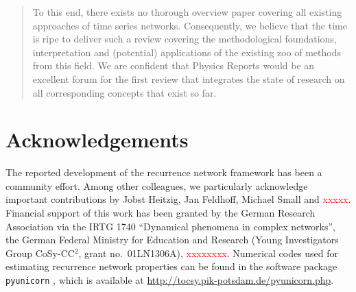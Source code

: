 \documentclass[3p,sort&compress]{elsarticle}
\begin{document}
\begin{frontmatter}
\begin{abstract}
To this end, there exists no thorough overview paper covering all existing
approaches of time series networks. Consequently, we believe that the time is
ripe to deliver such a review covering the methodological foundations,
interpretation and (potential) applications of the existing zoo of methods from
this field. We are confident that Physics Reports would be an excellent forum
for the first review that integrates the state of research on all corresponding
concepts that exist so far.
\end{abstract}

\begin{keyword}
\end{keyword}

\end{frontmatter}
\tableofcontents


























\section*{Acknowledgements}

The reported development of the recurrence network framework has been a community effort. Among other colleagues, we particularly acknowledge important contributions by Jobst Heitzig, Jan Feldhoff, Michael Small and \textcolor{red}{xxxxx}. Financial support of this work has been granted by the German Research Association via the IRTG 1740 ``Dynamical phenomena in complex networks'', the German Federal Ministry for Education and Research (Young Investigators Group CoSy-CC$^2$, grant no.~01LN1306A), \textcolor{red}{xxxxxxxx}. Numerical codes used for estimating recurrence network properties can be found in the software package \texttt{pyunicorn} \cite{donges2013advanced}, which is available at \url{http://tocsy.pik-potsdam.de/pyunicorn.php}.


\end{document}
